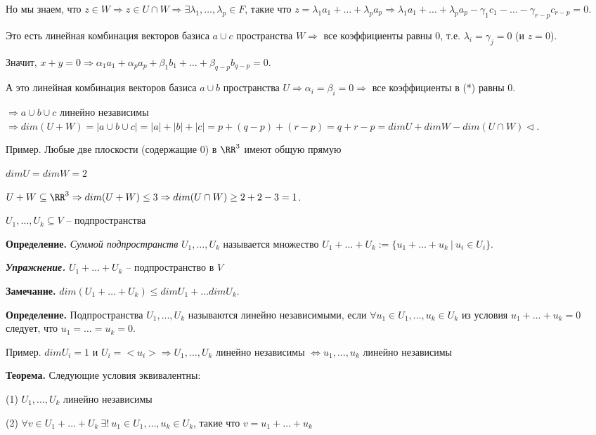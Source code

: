 Но мы знаем, что $z \in W \Rightarrow z \in U \cap W \Rightarrow \exists \lambda_1, \dots, \lambda_p \in F$, такие что $z = \lambda_1 a_1 + \dots + \lambda_p a_p \Rightarrow \lambda_1 a_1 + \dots + \lambda_p a_p - \gamma_1 c_1 - \dots - \gamma_{r-p} c_{r-p} = 0$.  

Это есть линейная комбинация векторов базиса $a \cup c$ пространства $W \Rightarrow$ все коэффициенты равны 0, т.е. $\lambda_i = \gamma_j = 0$ (и $z = 0$).

Значит, $x + y = 0 \Rightarrow \alpha_1 a_1 + \alpha_p a_p + \beta_1 b_1 + \dots + \beta_{q-p} b_{q-p} = 0$.

А это линейная комбинация векторов базиса $a \cup b$ пространства $U \Rightarrow \alpha_i = \beta_i = 0 \Rightarrow$ все коэффициенты в (*) равны 0.

$\Rightarrow a \cup b \cup c$ линейно независимы $\Rightarrow dim (U + W) = |a \cup b \cup c| = |a| + |b| + |c| = p + (q - p) + (r - p) = q + r - p = dimU + dim W - dim(U \cap W) \lhd.$

\bigskip
Пример. Любые две плоскости (содержащие 0) в $\RR^3$ имеют общую прямую 

$dimU = dimW = 2$

$U + W \subseteq \RR^3 \Rightarrow dim(U + W) \leq 3 \Rightarrow dim(U \cap W) \geq 2 + 2 - 3 = 1$.

\bigskip
$U_1, \dots, U_k \subseteq V$ -- подпространства

\bigskip
\textbf{Определение.} \textit{Суммой подпространств} $U_1, \dots, U_k$ называется множество $U_1 + \dots + U_k := \{u_1 + \dots + u_k \ | \ u_i \in U_i\}$.

\bigskip
\textbf{\textit{Упражнение.}} $U_1 + \dots + U_k$ -- подпространство в $V$

\bigskip
\textbf{Замечание.} $dim(U_1 + \dots + U_k) \leq dimU_1 + \dots dimU_k$.

\bigskip
\textbf{Определение.} Подпространства $U_1, \dots, U_k$ называются линейно независимыми, если $\forall u_1 \in U_1, \dots, u_k \in U_k$ из условия $u_1 + \dots + u_k = 0$ следует, что $u_1 = \dots = u_k = 0$.

\bigskip
Пример. $dim U_i = 1$ и $U_i = <u_i> \Rightarrow U_1, \dots, U_k$ линейно независимы $\Leftrightarrow u_1, \dots, u_k$ линейно независимы

\bigskip
\textbf{Теорема.} Следующие условия эквивалентны:

(1) $U_1, \dots, U_k$ линейно независимы

(2) $\forall v \in U_1 + \dots + U_k \ \exists! \ u_1 \in U_1, \dots, u_k \in U_k$, такие что $v = u_1 + \dots + u_k$

